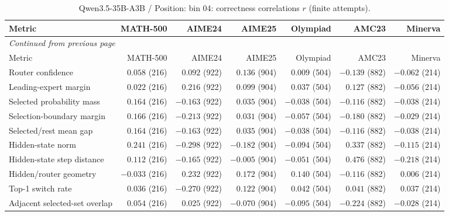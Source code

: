 \begingroup\scriptsize\setlength{\tabcolsep}{4pt}
\begin{longtable}{@{}lrrrrrr@{}}
\caption{Qwen3.5-35B-A3B / Position: bin 04: correctness correlations $r$ (finite attempts).}\label{tab:multi-qwen-position-bin_04}\\
\toprule
Metric & MATH-500 & AIME24 & AIME25 & Olympiad & AMC23 & Minerva \\
\midrule\endfirsthead
\multicolumn{7}{l}{\textit{Continued from previous page}}\\
\toprule
Metric & MATH-500 & AIME24 & AIME25 & Olympiad & AMC23 & Minerva \\
\midrule\endhead
\bottomrule\endfoot
Router confidence & $0.058$ (216) & $0.092$ (922) & $0.136$ (904) & $0.009$ (504) & $-0.139$ (882) & $-0.062$ (214) \\
Leading-expert margin & $0.022$ (216) & $0.216$ (922) & $0.099$ (904) & $0.037$ (504) & $0.127$ (882) & $-0.056$ (214) \\
Selected probability mass & $0.164$ (216) & $-0.163$ (922) & $0.035$ (904) & $-0.038$ (504) & $-0.116$ (882) & $-0.038$ (214) \\
Selection-boundary margin & $0.166$ (216) & $-0.213$ (922) & $0.031$ (904) & $-0.057$ (504) & $-0.180$ (882) & $-0.029$ (214) \\
Selected/rest mean gap & $0.164$ (216) & $-0.163$ (922) & $0.035$ (904) & $-0.038$ (504) & $-0.116$ (882) & $-0.038$ (214) \\
Hidden-state norm & $0.241$ (216) & $-0.298$ (922) & $-0.182$ (904) & $-0.094$ (504) & $0.337$ (882) & $-0.115$ (214) \\
Hidden-state step distance & $0.112$ (216) & $-0.165$ (922) & $-0.005$ (904) & $-0.051$ (504) & $0.476$ (882) & $-0.218$ (214) \\
Hidden/router geometry & $-0.033$ (216) & $0.232$ (922) & $0.172$ (904) & $0.140$ (504) & $-0.116$ (882) & $0.006$ (214) \\
Top-1 switch rate & $0.036$ (216) & $-0.270$ (922) & $0.122$ (904) & $0.042$ (504) & $0.041$ (882) & $0.037$ (214) \\
Adjacent selected-set overlap & $0.054$ (216) & $0.025$ (922) & $-0.070$ (904) & $-0.095$ (504) & $-0.224$ (882) & $-0.028$ (214) \\
\end{longtable}\endgroup

